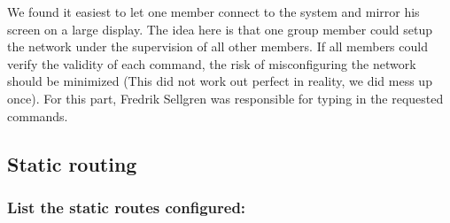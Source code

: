 \documentclass[a4paper, titlepage,12pt]{article}
\begin{document}
			We found it easiest to let one member connect to the system and mirror his screen on a large display. The idea here is that one group member could setup the network under the supervision of all other members. If all members could verify the validity of each command, the risk of misconfiguring the network should be minimized (This did not work out perfect in reality, we did mess up once). For this part, Fredrik Sellgren was responsible for typing in the requested commands.

		\subsection{Static routing}

		\subsubsection{List the static routes configured:}
\end{document}
